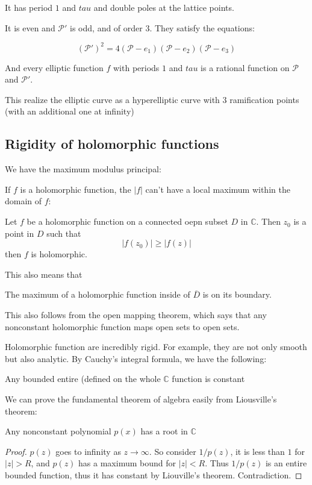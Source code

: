 \documentclass[main.tex]{subfiles}
\begin{document}
It has period $1$ and $tau$ and double poles at the lattice points.

It is even and $\mathcal{P}'$ is odd, and of order $3$. They satisfy the equations:

\begin{theorem}
$$
(\mathcal{P}')^2 = 4(\mathcal{P} - e_1)(\mathcal{P} - e_2)(\mathcal{P} - e_3)
$$
\end{theorem}
And every elliptic function $f$ with periods $1$ and $tau$ is a rational function on $\mathcal{P}$ and $\mathcal{P'}$.

This realize the elliptic curve as a hyperelliptic curve with 3 ramification points (with an additional one at infinity)
\subsection{Rigidity of holomorphic functions}

We have the maximum modulus principal:

If $f$ is a holomorphic function, the $|f|$ can't have a local maximum within the domain of $f$:

\begin{theorem}
Let $f$ be a holomorphic function on a connected oepn subset $D$ in $\mathbb{C}$. Then $z_0$ is a point in $D$ such that 
$$
|f(z_0)| \geq |f(z)|
$$
then $f$ is holomorphic.
\end{theorem}
This also means that 

\begin{corollary}
The maximum of a holomorphic function inside of $\overline{D}$ is on its boundary.
\end{corollary}
This also follows from the open mapping theorem, which says that any nonconstant holomorphic function maps open sets to open sets.

Holomorphic function are incredibly rigid. For example, they are not only smooth but also analytic. By Cauchy's integral formula, we have the following:

\begin{theorem}
Any bounded entire (defined on the whole $\mathbb{C}$ function is constant
\end{theorem}

We can prove the fundamental theorem of algebra easily from Liousville's theorem:

\begin{corollary}
Any nonconstant polynomial $p(x)$ has a root in $\mathbb{C}$
\end{corollary}
\begin{proof}
$p(z)$ goes to infinity as $z \rightarrow \infty$. So consider $1/p(z)$, it is less than $1$ for $|z| > R$, and $p(z)$ has a  maximum bound for $|z| < R$. Thus $1/p(z)$ is an entire bounded function, thus it has constant by Liouville's theorem. Contradiction.
\end{proof}
\end{document}
